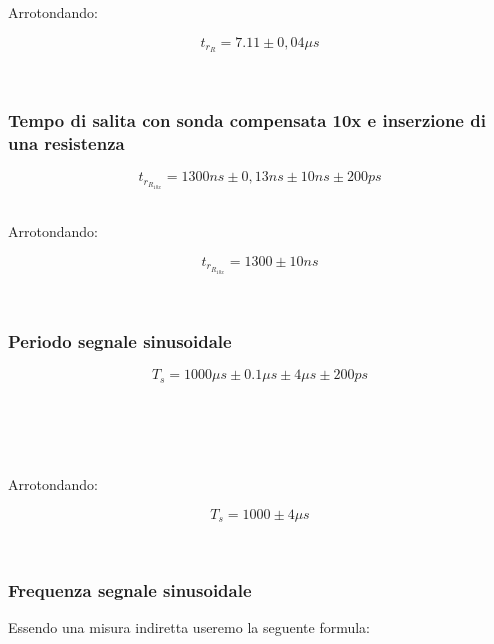\documentclass[a4paper]{article}
\begin{document}
Arrotondando: 

\begin{Large}
	\begin{equation}
		t_{r_R}= 7.11\pm 0,04 \mu s
	\end{equation}
\end{Large}\\

\subsubsection{Tempo di salita con sonda compensata 10x e inserzione di una resistenza}

\begin{Large}
	\begin{equation}
		{t_{r_{R_{10x}}}}= 1300ns \pm 0,13ns \pm10ns \pm200ps
	\end{equation}
\end{Large}\\

Arrotondando: 

\begin{Large}
	\begin{equation}
		{t_{r_{R_{10x}}}}= 1300\pm 10 ns
	\end{equation}
\end{Large}\\

\subsubsection{Periodo segnale sinusoidale}
\begin{Large}
	\begin{equation}
  		{T_s}= 1000\mu s\pm 0.1 \mu s \pm4 \mu s \pm200ps
	\end{equation}
\end{Large}\\
\\
\\
\\

Arrotondando: 

\begin{Large}
	\begin{equation}
		{T_s}= 1000 \pm 4\mu s 
	\end{equation}
\end{Large}\\


\subsubsection{Frequenza segnale sinusoidale}
Essendo una misura indiretta useremo la seguente formula:
\end{document}
